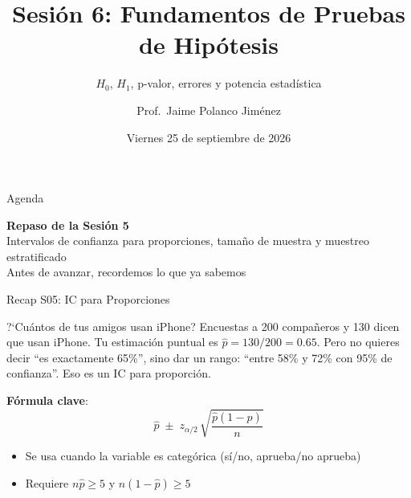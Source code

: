\documentclass[aspectratio=169, 11pt]{beamer}
\title{Sesión 6: Fundamentos de Pruebas de Hipótesis}
\subtitle{$H_0$, $H_1$, p-valor, errores y potencia estad\'istica}
\author{Prof.\ Jaime Polanco Jim\'enez}
\date{Viernes 25 de septiembre de 2026}
\begin{document}
\begin{frame}
\titlepage
\end{frame}

\begin{frame}{Agenda}
\tableofcontents
\end{frame}

\begin{frame}{}
\vfill
\centering
{\Large\textbf{Repaso de la Sesi\'on 5}}\\[1em]
{\normalsize Intervalos de confianza para proporciones, tama\~no de muestra y muestreo estratificado}\\[0.5em]
{\small Antes de avanzar, recordemos lo que ya sabemos}
\vfill
\end{frame}

\begin{frame}{Recap S05: IC para Proporciones}
\small
\begin{exampleblock}{?`Cu\'antos de tus amigos usan iPhone?}
Encuestas a 200 compa\~neros y 130 dicen que usan iPhone. Tu estimaci\'on puntual es $\hat{p} = 130/200 = 0.65$. Pero no quieres decir ``es exactamente 65\%'', sino dar un rango: ``entre 58\% y 72\% con 95\% de confianza''. Eso es un IC para proporci\'on.
\end{exampleblock}

\vspace{0.2cm}
\textbf{F\'ormula clave}:
\[
\hat{p} \;\pm\; z_{\alpha/2}\,\sqrt{\frac{\hat{p}(1-\hat{p})}{n}}
\]

\begin{itemize}\setlength{\itemsep}{1pt}
  \item Se usa cuando la variable es categ\'orica (s\'i/no, aprueba/no aprueba)
  \item Requiere $n\hat{p} \geq 5$ y $n(1-\hat{p}) \geq 5$
\end{itemize}
\end{frame}
\end{document}
